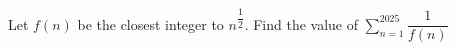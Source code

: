 Let $f(n)$ be the closest integer to $n^{\dfrac{1}{2}}$. Find the value of $\sum_{n=1}^{2025}\dfrac{1}{f(n)}$
